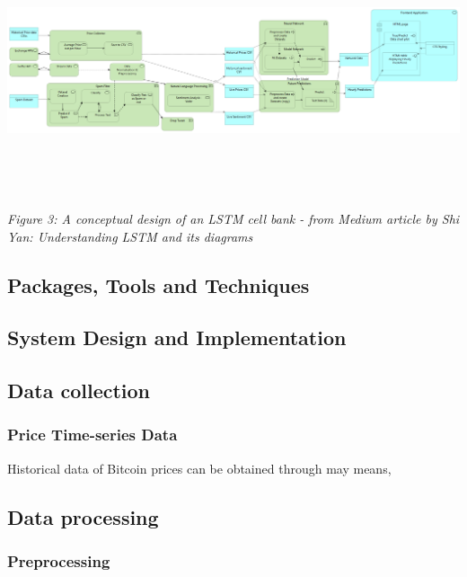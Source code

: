 \documentclass[oneside, 10pt]{article}
\begin{document}
		\begin{center}
			\includegraphics[width=17cm,height=8cm]{images/Generic_Flow.png}
			\newline
			\textit{Figure 3: A conceptual design of an LSTM cell bank - from Medium article by Shi Yan: Understanding LSTM and its diagrams}\cite{23}
		\end{center}
		
		\subsection{Packages, Tools and Techniques}\label{tools}
		
	\newpage
	
	\begin{center}	
		\section{System Design and Implementation}\label{implementation}
	\end{center}
		\subsection{Data collection}\label{collection}
			\subsubsection{Price Time-series Data}
			Historical data of Bitcoin prices can be obtained through may means, 
		
		\subsection{Data processing}\label{processing}
			\subsubsection{Preprocessing}
\end{document}
